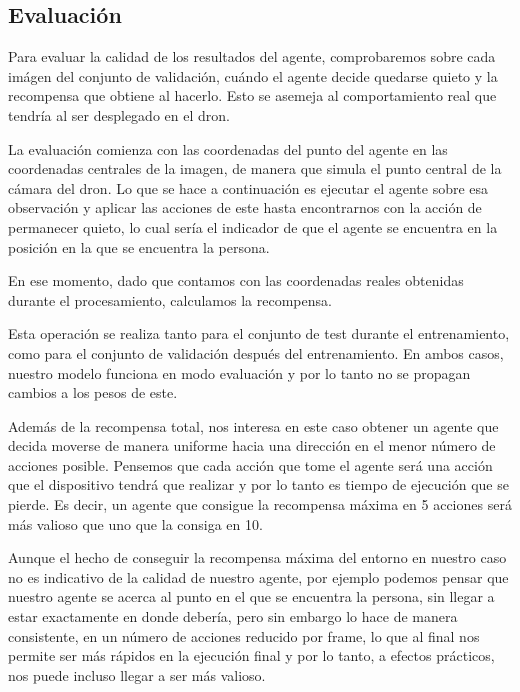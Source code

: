 \subsection{Evaluación}
\label{evaluacion}

Para evaluar la calidad de los resultados del agente, comprobaremos sobre cada imágen del conjunto de validación, cuándo el agente decide quedarse quieto y la recompensa que obtiene al hacerlo. Esto se asemeja al comportamiento real que tendría al ser desplegado en el dron.
\medskip

La evaluación comienza con las coordenadas del punto del agente en las coordenadas centrales de la imagen, de manera que simula el punto central de la cámara del dron. Lo que se hace a continuación es ejecutar el agente sobre esa observación y aplicar las acciones de este hasta encontrarnos con la acción de permanecer quieto, lo cual sería el indicador de que el agente se encuentra en la posición en la que se encuentra la persona. 
\medskip

En ese momento, dado que contamos con las coordenadas reales obtenidas durante el procesamiento, calculamos la recompensa.
\medskip

Esta operación se realiza tanto para el conjunto de test durante el entrenamiento, como para el conjunto de validación después del entrenamiento. En ambos casos, nuestro modelo funciona en modo evaluación y por lo tanto no se propagan cambios a los pesos de este.
\medskip

Además de la recompensa total, nos interesa en este caso obtener un agente que decida moverse de manera uniforme hacia una dirección en el menor número de acciones posible. Pensemos que cada acción que tome el agente será una acción que el dispositivo tendrá que realizar y por lo tanto es tiempo de ejecución que se pierde. Es decir, un agente que consigue la recompensa máxima en 5 acciones será más valioso que uno que la consiga en 10.
\medskip

Aunque el hecho de conseguir la recompensa máxima del entorno en nuestro caso no es indicativo de la calidad de nuestro agente, por ejemplo podemos pensar que nuestro agente se acerca al punto en el que se encuentra la persona, sin llegar a estar exactamente en donde debería, pero sin embargo lo hace de manera consistente, en un número de acciones reducido por frame, lo que al final nos permite ser más rápidos en la ejecución final y por lo tanto, a efectos prácticos, nos puede incluso llegar a ser más valioso.
\medskip

